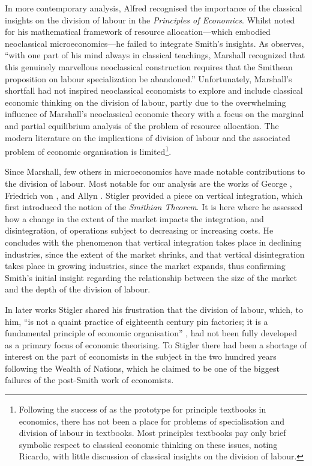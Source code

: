 In more contemporary analysis, Alfred \citet{Marshall1890} recognised the importance of the classical insights on the division of labour in the \textit{Principles of Economics}. Whilst noted for his mathematical framework of resource allocation---which embodied neoclassical microeconomics---he failed to integrate Smith's insights. As \citet[p.~6]{BuchananYoon1994} observes, ``with one part of his mind always in classical teachings, Marshall recognized that this genuinely marvellous neoclassical construction requires that the Smithean proposition on labour specialization be abandoned.'' Unfortunately, Marshall's shortfall had not inspired neoclassical economists to explore and include classical economic thinking on the division of labour, partly due to the overwhelming influence of Marshall's neoclassical economic theory with a focus on the marginal and partial equilibrium analysis of the problem of resource allocation. The modern literature on the implications of division of labour and the associated problem of economic organisation is limited\footnote{ Following the success of \citet{Samuelson1948} as the prototype for principle textbooks in economics, there has not been a place for problems of specialisation and division of labour in textbooks. Most principles textbooks pay only brief symbolic respect to classical economic thinking on these issues, noting Ricardo, with little discussion of classical insights on the division of labour.}.

Since Marshall, few others in microeconomics have made notable contributions to the division of labour. Most notable for our analysis are the works of George \citet{Stigler1951}, Friedrich von \citet{Hayek1945}, and Allyn \citet{Young1928}. Stigler provided a piece on vertical integration, which first introduced the notion of the \emph{Smithian Theorem}. It is here where he assessed how a change in the extent of the market impacts the integration, and disintegration, of operations subject to decreasing or increasing costs. He concludes with the phenomenon that vertical integration takes place in declining industries, since the extent of the market shrinks, and that vertical disintegration takes place in growing industries, since the market expands, thus confirming Smith's initial insight regarding the relationship between the size of the market and the depth of the division of labour.

In later works Stigler shared his frustration that the division of labour, which, to him, ``is not a quaint practice of eighteenth century pin factories; it is a fundamental principle of economic organisation'' \citep[p.~135]{Stigler1951}, had not been fully developed as a primary focus of economic theorising. To Stigler there had been a shortage of interest on the part of economists in the subject in the two hundred years following the Wealth of Nations, which he claimed to be one of the biggest failures of the post-Smith work of economists.

